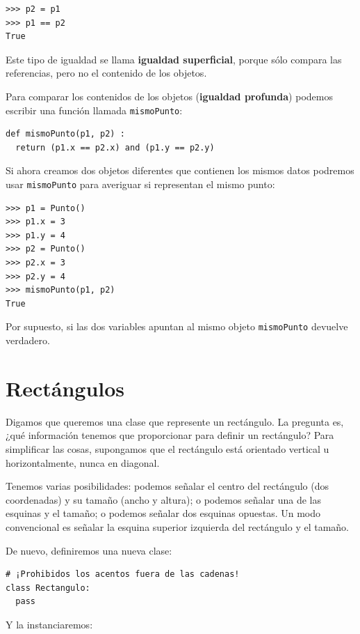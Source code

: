 \beforeverb
\begin{verbatim}
>>> p2 = p1
>>> p1 == p2
True
\end{verbatim}
\afterverb
%
Este tipo de igualdad se llama {\bf igualdad superficial}, porque sólo
compara las referencias, pero no el contenido de los objetos.


Para comparar los contenidos de los objetos ({\bf igualdad profunda}) podemos
escribir una función llamada \texttt{mismoPunto}:

\beforeverb
\begin{verbatim}
def mismoPunto(p1, p2) :
  return (p1.x == p2.x) and (p1.y == p2.y)
\end{verbatim}
\afterverb
%
Si ahora creamos dos objetos diferentes que contienen los mismos datos
podremos usar \texttt{mismoPunto} para averiguar si representan el mismo punto:

\beforeverb
\begin{verbatim}
>>> p1 = Punto()
>>> p1.x = 3
>>> p1.y = 4
>>> p2 = Punto()
>>> p2.x = 3
>>> p2.y = 4
>>> mismoPunto(p1, p2)
True
\end{verbatim}
\afterverb
%
Por supuesto, si las dos variables apuntan al mismo objeto \texttt{mismoPunto}
devuelve verdadero.


\section{Rectángulos}
\label{embedded}

Digamos que queremos una clase que represente un rectángulo. La pregunta es,
¿qué información tenemos que proporcionar para definir un rectángulo? Para
simplificar las cosas, supongamos que el rectángulo está orientado vertical u
horizontalmente, nunca en diagonal.

Tenemos varias posibilidades: podemos señalar el centro del rectángulo
(dos coordenadas) y su tamaño (ancho y altura); o podemos señalar una de
las esquinas y el tamaño; o podemos señalar dos esquinas opuestas. Un modo
convencional es señalar la esquina superior izquierda del rectángulo y el tamaño.

De nuevo, definiremos una nueva clase:

\beforeverb
\begin{verbatim}
# ¡Prohibidos los acentos fuera de las cadenas!
class Rectangulo:	
  pass
\end{verbatim}
\afterverb
%
Y la instanciaremos:

